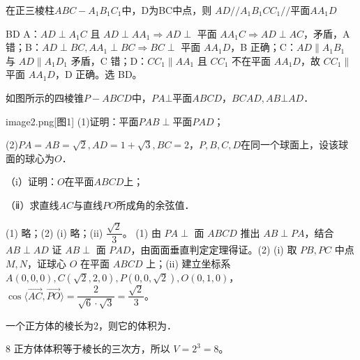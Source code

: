 


\begin{question}
在正三棱柱$ABC-A_1B_1C_1$中，D为BC中点，则\choiceBox
{}
{$AD//{A}_{1}{B}_{1}$}{$C{C}_{1}//\text{平面}A{A}_{1}D$}
\end{question}
\begin{answer}{BD}
A：$AD\perp A_1C$ 且 $AD\perp AA_1\Rightarrow AD\perp$ 平面 $AA_1C\Rightarrow AD\perp AC$，矛盾，A 错；B：$AD\perp BC,AA_1\perp BC\Rightarrow BC\perp$ 平面 $AA_1D$，B 正确；C：$AD\parallel A_1B_1$ 与 $AD\parallel A_1D_1$ 矛盾，C 错；D：$CC_1\parallel AA_1$ 且 $CC_1$ 不在平面 $AA_1D$，故 $CC_1\parallel$ 平面 $AA_1D$，D 正确。选 BD。
\end{answer}

\begin{question}
如图所示的四棱锥${{P}-{ABCD}}$中，$PA\bot $平面$ABCD$，$BC\mathrm{}AD,AB\bot AD$．
\begin{questionImageRight}[0.24\linewidth]{image2.png}[图1]
(1)证明：平面$P A B \perp$平面$PAD$；

(2)$PA=AB=\sqrt{2},AD=1+\sqrt{3},BC=2$，$P, B, C, D$在同一个球面上，设该球面的球心为$O$．

（i）证明：$O$在平面$ABCD$上；

（ⅱ）求直线$AC$与直线$PO$所成角的余弦值．
\end{questionImageRight}
\end{question}

\begin{answer}{(1) 略；(2) (i) 略；(ii) $\dfrac{\sqrt2}{3}$。}
(1) 由 $PA\perp$ 面 $ABCD$ 推出 $AB\perp PA$，结合 $AB\perp AD$ 证 $AB\perp$ 面 $PAD$，由面面垂直判定定理得证。(2) (i) 取 $PB,PC$ 中点 $M,N$，证球心 $O$ 在平面 $ABCD$ 上；(ii) 建立坐标系 $A(0,0,0),C(\sqrt2,2,0),P(0,0,\sqrt2),O(0,1,0)$，$\cos\langle\vec{AC},\vec{PO}\rangle=\dfrac{2}{\sqrt6\cdot\sqrt3}=\dfrac{\sqrt2}{3}$。
\end{answer}

\begin{question}[GPT生成]
一个正方体的棱长为$2$，则它的体积为\blank{3cm}．
\end{question}
\begin{answer}{8}
正方体体积等于棱长的三次方，所以 $V=2^3=8$。
\end{answer}

